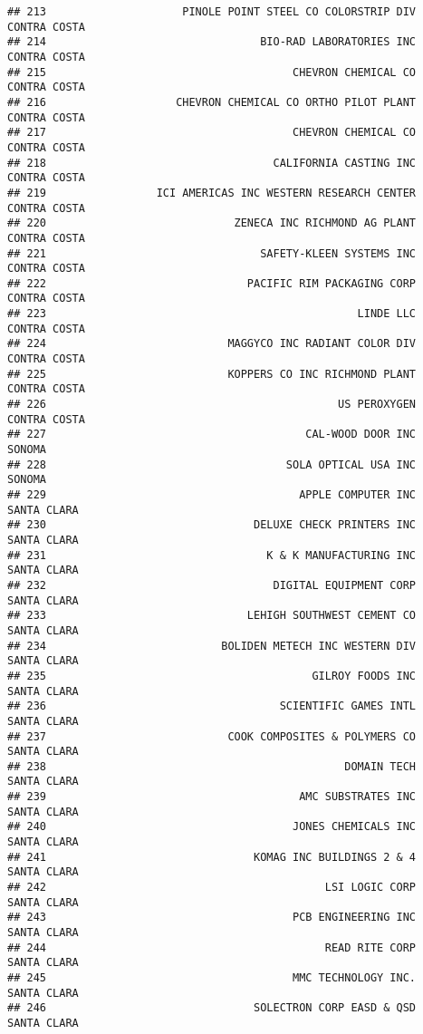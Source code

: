 \documentclass[
]{book}
\begin{document}
\begin{verbatim}
## 213                     PINOLE POINT STEEL CO COLORSTRIP DIV  CONTRA COSTA
## 214                                 BIO-RAD LABORATORIES INC  CONTRA COSTA
## 215                                      CHEVRON CHEMICAL CO  CONTRA COSTA
## 216                    CHEVRON CHEMICAL CO ORTHO PILOT PLANT  CONTRA COSTA
## 217                                      CHEVRON CHEMICAL CO  CONTRA COSTA
## 218                                   CALIFORNIA CASTING INC  CONTRA COSTA
## 219                 ICI AMERICAS INC WESTERN RESEARCH CENTER  CONTRA COSTA
## 220                             ZENECA INC RICHMOND AG PLANT  CONTRA COSTA
## 221                                 SAFETY-KLEEN SYSTEMS INC  CONTRA COSTA
## 222                               PACIFIC RIM PACKAGING CORP  CONTRA COSTA
## 223                                                LINDE LLC  CONTRA COSTA
## 224                            MAGGYCO INC RADIANT COLOR DIV  CONTRA COSTA
## 225                            KOPPERS CO INC RICHMOND PLANT  CONTRA COSTA
## 226                                             US PEROXYGEN  CONTRA COSTA
## 227                                        CAL-WOOD DOOR INC        SONOMA
## 228                                     SOLA OPTICAL USA INC        SONOMA
## 229                                       APPLE COMPUTER INC   SANTA CLARA
## 230                                DELUXE CHECK PRINTERS INC   SANTA CLARA
## 231                                  K & K MANUFACTURING INC   SANTA CLARA
## 232                                   DIGITAL EQUIPMENT CORP   SANTA CLARA
## 233                               LEHIGH SOUTHWEST CEMENT CO   SANTA CLARA
## 234                           BOLIDEN METECH INC WESTERN DIV   SANTA CLARA
## 235                                         GILROY FOODS INC   SANTA CLARA
## 236                                    SCIENTIFIC GAMES INTL   SANTA CLARA
## 237                            COOK COMPOSITES & POLYMERS CO   SANTA CLARA
## 238                                              DOMAIN TECH   SANTA CLARA
## 239                                       AMC SUBSTRATES INC   SANTA CLARA
## 240                                      JONES CHEMICALS INC   SANTA CLARA
## 241                                KOMAG INC BUILDINGS 2 & 4   SANTA CLARA
## 242                                           LSI LOGIC CORP   SANTA CLARA
## 243                                      PCB ENGINEERING INC   SANTA CLARA
## 244                                           READ RITE CORP   SANTA CLARA
## 245                                      MMC TECHNOLOGY INC.   SANTA CLARA
## 246                                SOLECTRON CORP EASD & QSD   SANTA CLARA

\end{verbatim}
\end{document}
